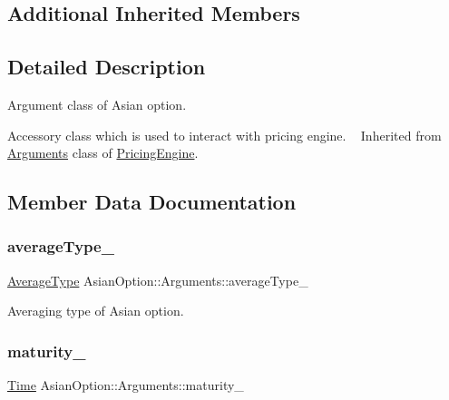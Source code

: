 \subsection*{Additional Inherited Members}


\subsection{Detailed Description}
Argument class of Asian option. 

Accessory class which is used to interact with pricing engine. ~\newline
Inherited from \hyperlink{class_asian_option_1_1_arguments}{Arguments} class of \hyperlink{class_pricing_engine}{Pricing\+Engine}. 

\subsection{Member Data Documentation}
\hypertarget{class_asian_option_1_1_arguments_aa93577b436b362136035ed3f6fc742bf}{}\label{class_asian_option_1_1_arguments_aa93577b436b362136035ed3f6fc742bf} 
\subsubsection{\texorpdfstring{average\+Type\+\_\+}{averageType\_}}
{\footnotesize\ttfamily \hyperlink{class_asian_option_add7292791bf85820ff9fdbfd4407f3b9}{Average\+Type} Asian\+Option\+::\+Arguments\+::average\+Type\+\_\+}



Averaging type of Asian option. 

\hypertarget{class_asian_option_1_1_arguments_ad39a2dee07ec9ec77cb64cb75e44a056}{}\label{class_asian_option_1_1_arguments_ad39a2dee07ec9ec77cb64cb75e44a056} 
\subsubsection{\texorpdfstring{maturity\+\_\+}{maturity\_}}
{\footnotesize\ttfamily \hyperlink{_name_def_8h_ac2d3e0ba793497bcca555c7c2cf64ff3}{Time} Asian\+Option\+::\+Arguments\+::maturity\+\_\+}



